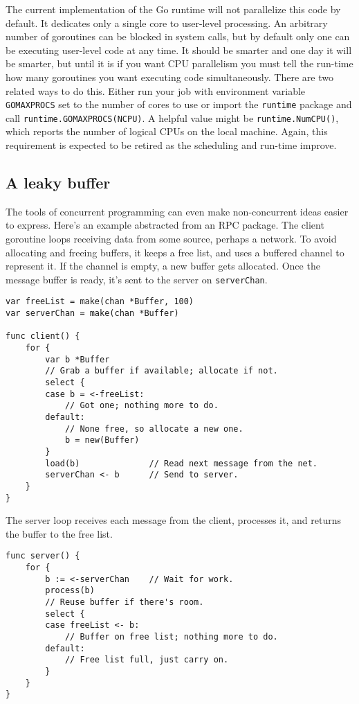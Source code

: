 The current implementation of the Go runtime will not parallelize this
code by default. It dedicates only a single core to user-level
processing. An arbitrary number of goroutines can be blocked in system
calls, but by default only one can be executing user-level code at any
time. It should be smarter and one day it will be smarter, but until it
is if you want CPU parallelism you must tell the run-time how many
goroutines you want executing code simultaneously. There are two related
ways to do this. Either run your job with environment variable
\texttt{GOMAXPROCS} set to the number of cores to use or import the
\texttt{runtime} package and call \texttt{runtime.GOMAXPROCS(NCPU)}. A
helpful value might be \texttt{runtime.NumCPU()}, which reports the
number of logical CPUs on the local machine. Again, this requirement is
expected to be retired as the scheduling and run-time improve.

\subsection*{A leaky buffer}

The tools of concurrent programming can even make non-concurrent ideas
easier to express. Here's an example abstracted from an RPC package. The
client goroutine loops receiving data from some source, perhaps a
network. To avoid allocating and freeing buffers, it keeps a free list,
and uses a buffered channel to represent it. If the channel is empty, a
new buffer gets allocated. Once the message buffer is ready, it's sent
to the server on \texttt{serverChan}.

\begin{Verbatim}[frame=single]
var freeList = make(chan *Buffer, 100)
var serverChan = make(chan *Buffer)

func client() {
    for {
        var b *Buffer
        // Grab a buffer if available; allocate if not.
        select {
        case b = <-freeList:
            // Got one; nothing more to do.
        default:
            // None free, so allocate a new one.
            b = new(Buffer)
        }
        load(b)              // Read next message from the net.
        serverChan <- b      // Send to server.
    }
}
\end{Verbatim}

The server loop receives each message from the client, processes it, and
returns the buffer to the free list.

\begin{Verbatim}[frame=single]
func server() {
    for {
        b := <-serverChan    // Wait for work.
        process(b)
        // Reuse buffer if there's room.
        select {
        case freeList <- b:
            // Buffer on free list; nothing more to do.
        default:
            // Free list full, just carry on.
        }
    }
}
\end{Verbatim}

